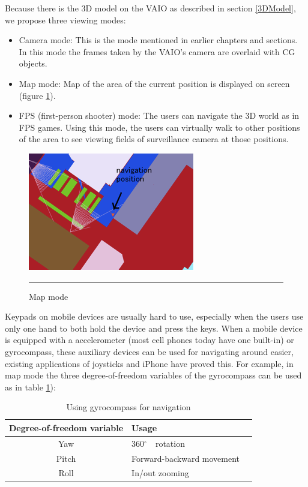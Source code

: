Because there is the 3D model on the VAIO as described in section \ref{3DModel}, we propose three viewing modes:

\begin{itemize}
	\item Camera mode: This is the mode mentioned in earlier chapters and sections. In this mode the frames taken by the VAIO's camera are overlaid with CG objects.
	\item Map mode: Map of the area of the current position is displayed on screen (figure \ref{fig:MapMode}).
	\item FPS (first-person shooter) mode: The users can navigate the 3D world as in FPS games. Using this mode, the users can virtually walk to other positions of the area to see viewing fields of surveillance camera at those positions.
\end{itemize}

\begin{figure}[htbp]
	\centering
	\includegraphics{./Primitives/map_mode.png}
	\rule{35em}{0.5pt}
	\caption[Map mode]{Map mode}
	\label{fig:MapMode}
\end{figure}

Keypads on mobile devices are usually hard to use, especially when the users use only one hand to both hold the device and press the keys. When a mobile device is equipped with a accelerometer (most cell phones today have one built-in) or gyrocompass, these auxiliary devices can be used for navigating around easier, existing applications of joysticks and iPhone have proved this. For example, in map mode the three degree-of-freedom variables of the gyrocompass can be used as in table \ref{tb:GyrocompassNavigation}):

\begin{table}[tb]
	\begin{center}
		\begin{tabular}{|c|l|l|}
			\hline
			Degree-of-freedom variable & Usage                     \\
			\hline
			Yaw                        & 360$^\circ$　rotation      \\
			Pitch                      & Forward-backward movement \\
			Roll                       & In/out zooming            \\
			\hline
		\end{tabular}
		\label{tb:GyrocompassNavigation}
		\caption{Using gyrocompass for navigation}
	\end{center}
\end{table}


